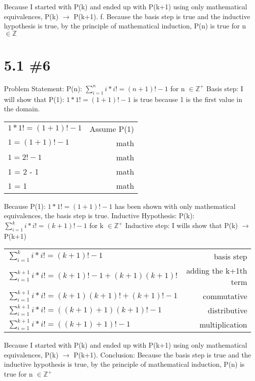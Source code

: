 \documentclass[h]{article}
\begin{document}
Because I started with P(k) and ended up with P(k+1) using only mathematical equivalences, P(k) $\rightarrow$ P(k+1).\newline
f. Because the basis step is true and the inductive hypothesis is true, by the principle of mathematical induction, P(n) is true for n $\in \mathbb{Z}$

\section*{5.1 \#6}
Problem Statement:\newline
P(n): $\sum\limits_{i=1}^{n} i*i! = (n+1)! - 1$ for n $\in \mathbb{Z}^+$\newline
Basis step:\newline
I will show that P(1): $1*1! = (1+1)! - 1$ is true because 1 is the first value in the domain.\newline
\begin{tabular}{l|r}
$1*1! = (1+1)! - 1$ & Assume P(1)\\
$ 1 = (1+1)! -1$ & math\\
$ 1 = 2! - 1$ & math\\
1 = 2 - 1 & math \\ 
1 = 1 & math\\
\end{tabular}
\newline
Because P(1): $1*1! = (1+1)! - 1$ has been shown with only mathematical equivalences, the basis step is true.
\newline
Inductive Hypothesis:\newline
P(k): $\sum\limits_{i=1}^{k} i*i! = (k+1)! - 1$ for k $\in \mathbb{Z}^+$\newline
Inductive step:\newline
I wills show that P(k) $\rightarrow$ P(k+1)\newline
\begin{tabular}{l|r}
$\sum\limits_{i=1}^{k} i*i! = (k+1)! - 1$ & basis step\\
$\sum\limits_{i=1}^{k+1} i*i! = (k+1)! - 1 + (k+1)(k+1)!$ & adding the k+1th term\\
$\sum\limits_{i=1}^{k+1} i*i! = (k+1)(k+1)! + (k+1)! - 1$ & commutative\\
$\sum\limits_{i=1}^{k+1} i*i! = ((k+1)+1)(k+1)! - 1$ & distributive\\
$\sum\limits_{i=1}^{k+1} i*i! = ((k+1)+1)! - 1$ & multiplication\\
\end{tabular}\newline
Because I started with P(k) and ended up with P(k+1) using only mathematical equivalences, P(k) $\rightarrow$ P(k+1).\newline
Conclusion:\newline
Because the basis step is true and the inductive hypothesis is true, by the principle of mathematical induction, P(n) is true for n $\in \mathbb{Z}^+$
\end{document}
